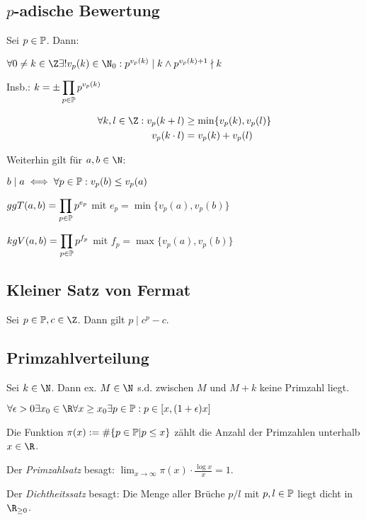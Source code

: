\subsection*{$p$-adische Bewertung}

Sei $p \in \mathbb{P}$. Dann:

$\forall 0 \neq k \in \Z \exists! v_p(k) \in \N_0 : p^{v_p(k)} \mid k \land p^{v_p(k)+1} \nmid k$

Insb.: $k = \pm \displaystyle\prod_{p \in \mathbb{P}} p^{v_p(k)}$

\vspace*{-4mm}
\begin{align*}
\forall k, l \in \Z: v_p(k+l)   &\geq \min\{v_p(k),v_p(l)\} \\
             v_p(k \cdot l) &= v_p(k) + v_p(l)
\end{align*}

Weiterhin gilt für $a, b \in \N$:

$b \mid a \iff \forall p \in \mathbb{P} : v_p(b) \leq v_p(a)$

$ggT(a,b) = \displaystyle\prod_{p \in \mathbb{P}} p^{e_p}$ mit $e_p = \min\{v_p(a),v_p(b)\}$

$kgV(a,b) = \displaystyle\prod_{p \in \mathbb{P}} p^{f_p}$ mit $f_p = \max\{v_p(a),v_p(b)\}$

\subsection*{Kleiner Satz von Fermat}

Sei $p \in \Primes, c \in \Z$. Dann gilt $p \mid c^p - c$.

\subsection*{Primzahlverteilung}

Sei $k \in \N$. Dann ex. $M \in \N$ s.d. zwischen $M$ und $M+k$ keine Primzahl liegt.

$\forall \epsilon > 0 \exists x_0 \in \R \forall x \geq x_0 \exists p \in \Primes : p \in [x,(1+\epsilon)x]$

\vspace*{2mm}

Die Funktion $\pi(x) := \#\{ p \in \mathbb{P} | p \leq x \}$ zählt die Anzahl der Primzahlen unterhalb $x \in \R$.

Der \emph{Primzahlsatz} besagt: $\lim_{x \to \infty} \pi(x) \cdot \frac{\log{x}}{x} = 1$.

Der \emph{Dichtheitssatz} besagt: Die Menge aller Brüche $p/l$ mit $p, l \in \mathbb{P}$ liegt dicht in $\R_{\geq 0}$.

